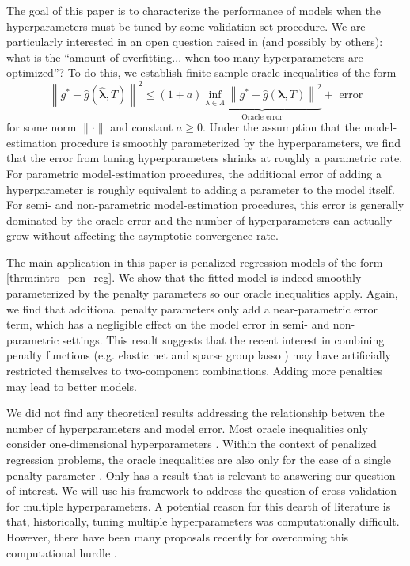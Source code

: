 \documentclass[12pt]{article}
\begin{document}
The goal of this paper is to characterize the performance of models when the hyperparameters must be tuned by some validation set procedure. We are particularly interested in an open question raised in \citet{bengio2000gradient} (and possibly by others): what is the ``amount of overfitting... when too many hyperparameters are optimized''? To do this, we establish finite-sample oracle inequalities of the form
\begin{equation}
\label{thrm:intro_oracle_ineq}
\left \| g^* - \hat{g}\left (\hat{\boldsymbol{\lambda}}, T \right ) \right \|^2
\le
(1+a)
\underbrace{\inf_{\lambda \in \Lambda} \left \| g^* - \hat{g}\left (\boldsymbol{\lambda} , T \right ) \right \|^2}_{\text{Oracle error}}
+ \text{ error}
\end{equation}
for some norm $\| \cdot \|$ and constant $a \ge 0$. Under the assumption that the model-estimation procedure is smoothly parameterized by the hyperparameters, we find that the error from tuning hyperparameters shrinks at roughly a parametric rate. For parametric model-estimation procedures, the additional error of adding a hyperparameter is roughly equivalent to adding a parameter to the model itself. For semi- and non-parametric model-estimation procedures, this error is generally dominated by the oracle error and the number of hyperparameters can actually grow without affecting the asymptotic convergence rate.

The main application in this paper is penalized regression models of the form \eqref{thrm:intro_pen_reg}. We show that the fitted model is indeed smoothly parameterized by the penalty parameters so our oracle inequalities apply. Again, we find that additional penalty parameters only add a near-parametric error term, which has a negligible effect on the model error in semi- and non-parametric settings. This result suggests that the recent interest in combining penalty functions (e.g. elastic net and sparse group lasso \citep{zou2003regression, simon2013sparse}) may have artificially restricted themselves to two-component combinations. Adding more penalties may lead to better models.

We did not find any theoretical results addressing the relationship betwen the number of hyperparameters and model error. Most oracle inequalities only consider one-dimensional hyperparameters \citep{van2003unified, van2004asymptotic, gyorfi2006distribution}. Within the context of penalized regression problems, the oracle inequalities are also only for the case of a single penalty parameter \citep{golub1979generalized, chetverikov2016cross, chatterjee2015prediction}. Only \citet{lecue2012oracle} has a result that is relevant to answering our question of interest. We will use his framework to address the question of cross-validation for multiple hyperparameters. A potential reason for this dearth of literature is that, historically, tuning multiple hyperparameters was computationally difficult. However, there have been many proposals recently for overcoming this computational hurdle \citep{bengio2000gradient, foo2008efficient, snoek2012practical}.
\end{document}
